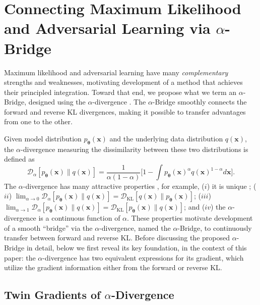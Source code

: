 \documentclass[letterpaper]{article} %
\newcommand{\Dc}[0]{\ensuremath{\mathcal{D}} }
\newcommand{\xv}[0]{\ensuremath{\boldsymbol{x}} }
\newcommand{\thetav}[0]{\ensuremath{\boldsymbol{\theta}} }
\newcommand{\KL}[0]{\ensuremath{\mathrm{KL}} }
\begin{document}
\section{Connecting Maximum Likelihood and Adversarial Learning via $\alpha$-Bridge}
\label{sec:Trans}



Maximum likelihood and adversarial learning have many {\em complementary} strengths and weaknesses, motivating development of a method that achieves their principled integration. Toward that end, we propose what we term an $\alpha$-Bridge, designed using the $\alpha$-divergence \cite{cichocki2010families}. The $\alpha$-Bridge smoothly connects the forward and reverse KL divergences, making it possible to transfer advantages from one to the other.


Given model distribution $p_{\thetav}(\xv)$ and the underlying data distribution $q(\xv)$, the $\alpha$-divergence measuring the dissimilarity between these two distributions is defined as 
\begin{equation}\label{eq:alpha-div}
    \Dc_{\alpha} [p_{\thetav}(\xv) \| q(\xv)]
    = \frac{1}{\alpha (1 - \alpha)} \Big[
    1 - \int p_{\thetav}(\xv)^{\alpha} q(\xv)^{1-\alpha} d\xv \Big].
\end{equation}
The $\alpha$-divergence has many attractive properties \cite{cichocki2010families}, for example, 
($i$) it is unique \cite{amari2009alpha};
($ii$) $\lim_{\alpha \to 0} \Dc_{\alpha} [p_{\thetav} (\xv) \| q(\xv) ] = \Dc_{\KL} [q(\xv) \| p_{\thetav} (\xv) ]$; 
($iii$) $\lim_{\alpha \to 1} \Dc_{\alpha} [p_{\thetav}(\xv) \| q(\xv) ] = \Dc_{\KL} [p_{\thetav}(\xv) \| q(\xv) ]$; and 
($iv$) the $\alpha$-divergence is a continuous function of $\alpha$. 
These properties motivate development of a smooth ``bridge'' via the $\alpha$-divergence, named the $\alpha$-Bridge, to continuously transfer between forward and reverse KL. Before discussing the proposed $\alpha$-Bridge in detail, below we first reveal its key foundation, in the context of this paper: the $\alpha$-divergence has two equivalent expressions for its gradient, which utilize the gradient information either from the forward or reverse KL.

\subsection{Twin Gradients of $\alpha$-Divergence}
\label{sec:Grad}
\end{document}
